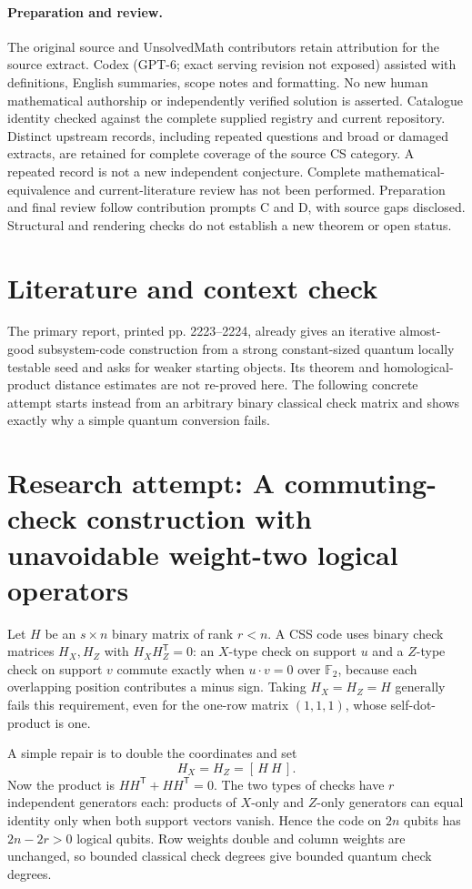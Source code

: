 \documentclass[11pt]{article}
\begin{document}
\paragraph{Preparation and review.}
The original source and UnsolvedMath contributors retain attribution for the source extract. Codex (GPT-6; exact serving revision not exposed) assisted with definitions, English summaries, scope notes and formatting. No new human mathematical authorship or independently verified solution is asserted. Catalogue identity checked against the complete supplied registry and current repository. Distinct upstream records, including repeated questions and broad or damaged extracts, are retained for complete coverage of the source CS category. A repeated record is not a new independent conjecture. Complete mathematical-equivalence and current-literature review has not been performed. Preparation and final review follow contribution prompts C and D, with source gaps disclosed. Structural and rendering checks do not establish a new theorem or open status.
\label{end:statement}

\section{Literature and context check}
The primary report, printed pp. 2223--2224, already gives an iterative almost-good subsystem-code construction from a strong constant-sized quantum locally testable seed and asks for weaker starting objects. Its theorem and homological-product distance estimates are not re-proved here. The following concrete attempt starts instead from an arbitrary binary classical check matrix and shows exactly why a simple quantum conversion fails.
\section{Research attempt: A commuting-check construction with unavoidable weight-two logical operators}

Let $H$ be an $s\times n$ binary matrix of rank $r<n$. A CSS code uses binary check matrices $H_X,H_Z$ with $H_XH_Z^{\mathsf T}=0$: an $X$-type check on support $u$ and a $Z$-type check on support $v$ commute exactly when $u\cdot v=0$ over $\mathbb F_2$, because each overlapping position contributes a minus sign. Taking $H_X=H_Z=H$ generally fails this requirement, even for the one-row matrix $(1,1,1)$, whose self-dot-product is one.

A simple repair is to double the coordinates and set
\[
H_X=H_Z=[\,H\ H\,].
\]
Now the product is $HH^{\mathsf T}+HH^{\mathsf T}=0$. The two types of checks have $r$ independent generators each: products of $X$-only and $Z$-only generators can equal identity only when both support vectors vanish. Hence the code on $2n$ qubits has $2n-2r>0$ logical qubits. Row weights double and column weights are unchanged, so bounded classical check degrees give bounded quantum check degrees.
\end{document}
